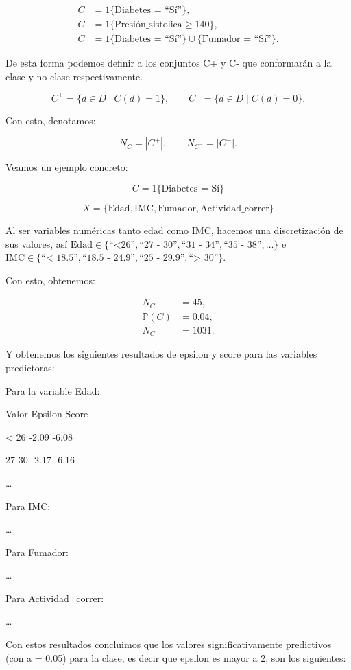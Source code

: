 \documentclass[
 12pt,
 letterpaper,
]{article}
\theoremstyle{teoremaBreak}
\theoremstyle{plain}
\theoremstyle{definition}
\begin{document}
\begin{align*}
C &= 1\{\text{Diabetes = ``Sí''}\}, \\
C &= 1\{\text{Presión\_sistolica} \ge 140\}, \\
C &= 1\{\text{Diabetes = ``Sí''}\} \cup \{\text{Fumador = ``Sí''}\}.
\end{align*}

De esta forma podemos definir a los conjuntos C+ y C- que conformarán a
la clase y no clase respectivamente.

\[
C^+ = \{d \in D \mid C(d) = 1\}, \qquad
C^- = \{d \in D \mid C(d) = 0\}.
\]

Con esto, denotamos:

\[
N_C = |C^+|, \qquad N_{C^-} = |C^-|.
\]

Veamos un ejemplo concreto:

\[
C = 1\{\text{Diabetes = Sí}\}
\]

\[
X = \{\text{Edad}, \text{IMC}, \text{Fumador}, \text{Actividad\_correr}\}
\]

Al ser variables numéricas tanto edad como IMC, hacemos una
discretización de sus valores, así $\text{Edad} \in \{\text{``<26''}, \text{``27 -
30''}, \text{``31 - 34''}, \text{``35 - 38''}, \ldots\}$ e $\text{IMC} \in \{\text{``< 18.5''},
\text{``18.5 - 24.9''}, \text{``25 - 29.9''}, \text{``> 30''}\}$.

Con esto, obtenemos:

\begin{align*}
N_C &= 45, \\
\mathbb{P}(C) &= 0.04, \\
N_{C^-} &= 1031.
\end{align*}

Y obtenemos los siguientes resultados de epsilon y score para las
variables predictoras:

Para la variable Edad:

Valor Epsilon Score

\textless{} 26 -2.09 -6.08

27-30 -2.17 -6.16

\ldots{}

Para IMC:

\ldots{}

Para Fumador:

\ldots{}

Para Actividad\_correr:

\ldots{}

Con estos resultados concluimos que los valores significativamente
predictivos (con a = 0.05) para la clase, es decir que epsilon es mayor
a 2, son los siguientes:
\end{document}
